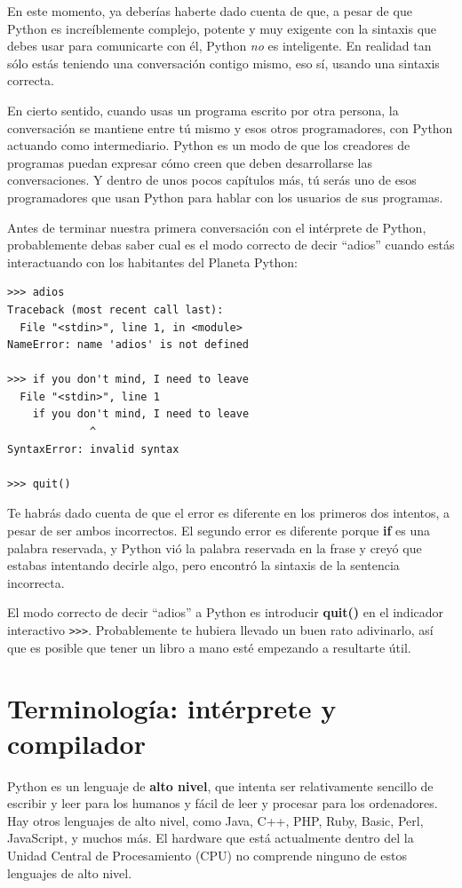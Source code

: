 En este momento, ya deberías haberte dado cuenta de que, a pesar de que Python
es increíblemente complejo, potente y muy exigente con
la sintaxis que debes usar para comunicarte con él, Python {\em no} es
inteligente. En realidad tan sólo estás teniendo una conversación
contigo mismo, eso sí, usando una sintaxis correcta.

En cierto sentido, cuando usas un programa escrito por otra persona,
la conversación se mantiene entre tú mismo y esos otros programadores,
con Python actuando como intermediario. Python es un
modo de que los creadores de programas puedan expresar cómo creen
que deben desarrollarse las conversaciones. Y dentro
de unos pocos capítulos más, tú serás uno de esos programadores
que usan Python para hablar con los usuarios de sus programas.

Antes de terminar nuestra primera conversación con el intérprete
de Python, probablemente debas saber cual es el modo correcto
de decir ``adios'' cuando estás interactuando con los
habitantes del Planeta Python:

\beforeverb
\begin{verbatim}
>>> adios
Traceback (most recent call last):
  File "<stdin>", line 1, in <module>
NameError: name 'adios' is not defined

>>> if you don't mind, I need to leave
  File "<stdin>", line 1
    if you don't mind, I need to leave
             ^
SyntaxError: invalid syntax

>>> quit()
\end{verbatim}
\afterverb
%
Te habrás dado cuenta de que el error es diferente en los primeros
dos intentos, a pesar de ser ambos incorrectos. El segundo error es diferente porque
{\bf if} es una palabra reservada, y Python vió la palabra
reservada en la frase y creyó que estabas intentando decirle algo, pero encontró
la sintaxis de la sentencia incorrecta.

El modo correcto de decir ``adios'' a Python es introducir
{\bf quit()} en el indicador interactivo {\tt >>>}.
Probablemente te hubiera llevado un buen rato adivinarlo,
así que es posible que tener un libro a mano
esté empezando a resultarte útil.

\section{Terminología: intérprete y compilador}

Python es un lenguaje de {\bf alto nivel}, que intenta ser relativamente
sencillo de escribir y leer para los humanos y fácil de leer y procesar para
los ordenadores. Hay otros lenguajes de alto nivel, como Java, C++,
PHP, Ruby, Basic, Perl, JavaScript, y muchos más. El hardware que está
actualmente dentro del la Unidad Central de Procesamiento (CPU) no comprende
ninguno de estos lenguajes de alto nivel.

